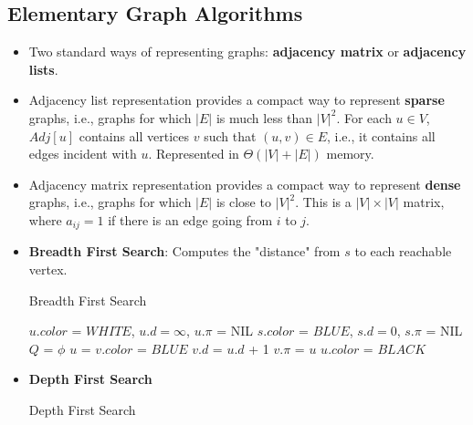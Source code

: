 \documentclass[a4paper]{article}
\begin{document}
\subsection{Elementary Graph Algorithms}
\begin{itemize}
    \item Two standard ways of representing graphs: \textbf{adjacency matrix} or \textbf{adjacency lists}.
    \item Adjacency list representation provides a compact way to represent \textbf{sparse} graphs, i.e., graphs for which $|E|$ is much less than $|V|^2$. For each $u\in V$, $Adj[u]$ contains all vertices $v$ such that $(u,v)\in E$, i.e., it contains all edges incident with $u$. Represented in $\Theta(|V|+|E|)$ memory.
    \item Adjacency matrix representation provides a compact way to represent \textbf{dense} graphs, i.e., graphs for which $|E|$ is close to $|V|^2$. This is a $|V|\times |V|$ matrix, where $a_{ij}=1$ if there is an edge going from $i$ to $j$.
    \item \textbf{Breadth First Search}: Computes the "distance" from $s$ to each reachable vertex.
    \begin{algorithm}[H]
        \caption{Breadth First Search}\label{alg:ST-BFS}
        \begin{algorithmic}[1]
            \Statex {}
                \State $u.color$ = $WHITE$, $u.d=\infty$, $u.\pi$ = NIL
            \EndFor
            \State $s.color$ = $BLUE$, $s.d=0$, $s.\pi$ = NIL
            \State $Q$ = $\phi$
            \State {}
                \State $u$ = 
                        \State $v.color$ = $BLUE$
                        \State $v.d$ = $u.d$ + 1
                        \State $v.\pi$ = $u$
                        \State {}
                    \EndIf
                \EndFor
                \State $u.color$ = $BLACK$
            \EndWhile
        \end{algorithmic}
    \end{algorithm}
    \item \textbf{Depth First Search}
    \begin{algorithm}[H]
        \caption{Depth First Search}
        \begin{algorithmic}[1]
            \Statex {}

\end{algorithmic}
\end{algorithm}
\end{itemize}
\end{document}
